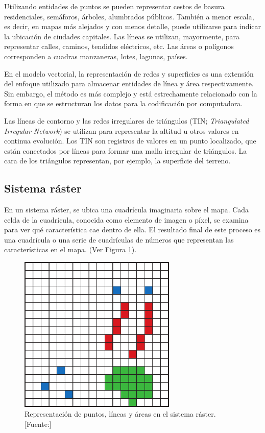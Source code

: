 Utilizando entidades de puntos se pueden representar cestos de basura residenciales, semáforos, árboles, alumbrados públicos. También a menor escala, es decir, en mapas más alejados y con menos detalle, puede utilizarse para indicar la ubicación de ciudades capitales. Las líneas se utilizan, mayormente, para representar calles, caminos, tendidos eléctricos, etc. Las áreas o polígonos corresponden a cuadras manzaneras, lotes, lagunas, países.

En el modelo vectorial, la representación de redes y superficies es una extensión del enfoque utilizado para almacenar entidades de línea y área respectivamente. Sin embargo, el método es más complejo y está estrechamente relacionado con la forma en que se estructuran los datos para la codificación por computadora.

Las líneas de contorno y las redes irregulares de triángulos (TIN; \textit{Triangulated Irregular Network}) se utilizan para representar la altitud u otros valores en continua evolución. Los TIN son registros de valores en un punto localizado, que están conectados por líneas para formar una malla irregular de triángulos. La cara de los triángulos representan, por ejemplo, la superficie del terreno.

\subsection{Sistema ráster}

En un sistema ráster, se ubica una cuadrícula imaginaria sobre el mapa. Cada celda de la cuadrícula, conocida como elemento de imagen o píxel, se examina para ver qué característica cae dentro de ella. El resultado final de este proceso es una cuadrícula o una serie de cuadrículas de números que representan las características en el mapa. (Ver Figura \ref{fig:modeloRaster}).

\begin{figure}[H]
    \centering
    \includegraphics[width=7.5cm]{modeloRaster.png}
    \caption{Representación de puntos, líneas y áreas en el sistema ráster. [Fuente:\citet{Heywood2006AnSystems}]}
    \label{fig:modeloRaster}
\end{figure}

